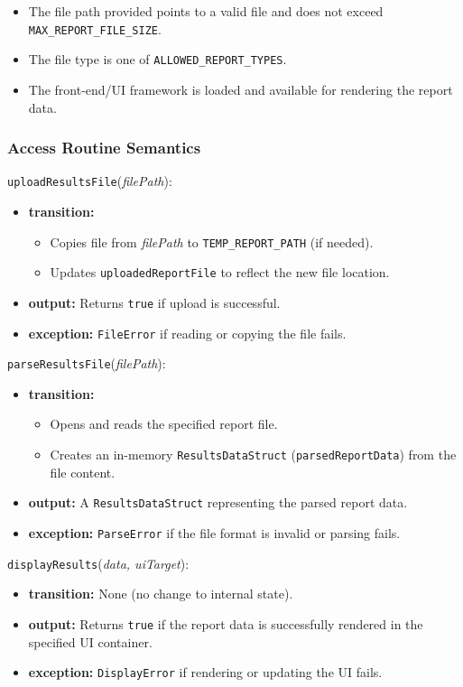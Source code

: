 \documentclass[12pt, titlepage]{article}
\begin{document}
\begin{itemize}
    \item The file path provided points to a valid file and does not exceed \texttt{MAX\_REPORT\_FILE\_SIZE}.
    \item The file type is one of \texttt{ALLOWED\_REPORT\_TYPES}.
    \item The front-end/UI framework is loaded and available for rendering the report data.
\end{itemize}

\subsubsection{Access Routine Semantics}

\noindent \texttt{uploadResultsFile}(\textit{filePath}):
\begin{itemize}
    \item \textbf{transition:}
    \begin{itemize}
        \item Copies file from \textit{filePath} to \texttt{TEMP\_REPORT\_PATH} (if needed).
        \item Updates \texttt{uploadedReportFile} to reflect the new file location.
    \end{itemize}
    \item \textbf{output:} Returns \texttt{true} if upload is successful.
    \item \textbf{exception:} \texttt{FileError} if reading or copying the file fails.
\end{itemize}

\noindent \texttt{parseResultsFile}(\textit{filePath}):
\begin{itemize}
    \item \textbf{transition:}
    \begin{itemize}
        \item Opens and reads the specified report file.
        \item Creates an in-memory \texttt{ResultsDataStruct} (\texttt{parsedReportData}) from the file content.
    \end{itemize}
    \item \textbf{output:} A \texttt{ResultsDataStruct} representing the parsed report data.
    \item \textbf{exception:} \texttt{ParseError} if the file format is invalid or parsing fails.
\end{itemize}

\noindent \texttt{displayResults}(\textit{data, uiTarget}):
\begin{itemize}
    \item \textbf{transition:} None (no change to internal state).
    \item \textbf{output:} Returns \texttt{true} if the report data is successfully rendered in the specified UI container.
    \item \textbf{exception:} \texttt{DisplayError} if rendering or updating the UI fails.
\end{itemize}
\end{document}
